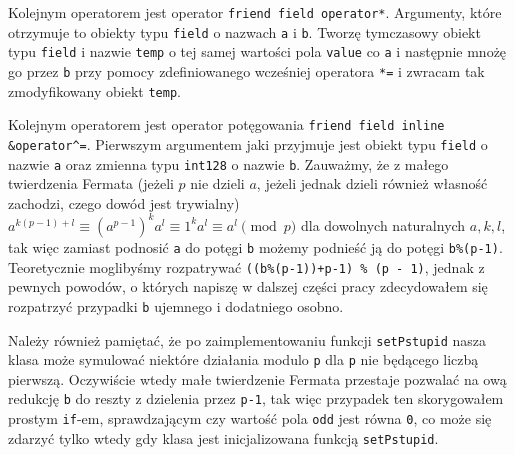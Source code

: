 \documentclass{article}
\begin{document}
Kolejnym operatorem jest operator \texttt{friend field operator*}. Argumenty, które otrzymuje
to obiekty typu \texttt{field} o nazwach \texttt{a} i \texttt{b}. Tworzę tymczasowy obiekt typu \texttt{field} i nazwie \texttt{temp}
o tej samej wartości pola \texttt{value} co \texttt{a} i następnie mnożę go przez \texttt{b} przy pomocy
zdefiniowanego wcześniej operatora \texttt{*=} i zwracam tak zmodyfikowany obiekt \texttt{temp}.

Kolejnym operatorem jest operator potęgowania \texttt{friend field inline \&operator}\verb!^!\texttt{=}. 
Pierwszym argumentem jaki przyjmuje jest obiekt typu \texttt{field} o nazwie \texttt{a} oraz zmienna typu 
\texttt{\textunderscore \textunderscore int128} o
nazwie \texttt{b}. Zauważmy, że z małego twierdzenia Fermata (jeżeli $p$ nie dzieli $a$, jeżeli jednak dzieli również własność zachodzi, 
czego dowód jest trywialny) $a^{k(p-1)+l} \equiv (a^{p-1})^ka^l \equiv 1^ka^l \equiv a^l \pmod p$ dla dowolnych naturalnych
$a,k,l$, tak więc
zamiast podnosić \texttt{a} do potęgi \texttt{b} możemy podnieść ją do potęgi \texttt{b\%(p-1)}.
Teoretycznie moglibyśmy rozpatrywać \texttt{((b\%(p-1))+p-1) \% (p - 1)}, jednak z pewnych powodów, o 
których napiszę w dalszej części pracy zdecydowałem się rozpatrzyć przypadki \texttt{b} ujemnego i 
dodatniego osobno. 

Należy również pamiętać, że po zaimplementowaniu funkcji \texttt{setPstupid}
nasza klasa może symulować niektóre działania modulo \texttt{p} dla \texttt{p}
nie będącego liczbą pierwszą. Oczywiście wtedy małe twierdzenie Fermata
przestaje pozwalać na ową redukcję \texttt{b} do reszty z dzielenia przez
\texttt{p-1}, tak więc przypadek ten skorygowałem prostym \texttt{if}-em, sprawdzającym 
czy wartość pola \texttt{odd} jest równa \texttt{0}, co może się zdarzyć tylko wtedy gdy klasa 
jest inicjalizowana funkcją \texttt{setPstupid}.
\end{document}
